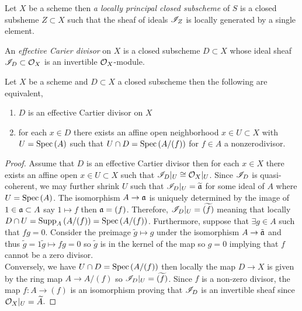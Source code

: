 \documentclass[12pt]{article}
\begin{document}
\begin{definition}
Let $X$ be a scheme then \textit{a locally principal closed subscheme} of $S$ is a closed subsheme $Z \subset X$ such that the sheaf of ideals $\mathscr{I}_Z$ is locally generated by a single element. 
\end{definition}

\begin{definition}
An \textit{effective Carier divisor} on $X$ is a closed subscheme $D \subset X$ whose ideal sheaf $\mathscr{I}_D \subset \mathcal{O}_{X}$ is an invertible $\mathcal{O}_{X}$-module. 
\end{definition}

\begin{definition}
Let $X$ be a scheme and $D \subset X$ a closed subscheme then the following are equivalent,
\begin{enumerate}
\item $D$ is an effective Cartier divisor on $X$
\item for each $x \in D$ there exists an affine open neighborhood $x \in U \subset X$ with $U = \mathrm{Spec}\left( A \right)$ such that $U \cap D = \mathrm{Spec}\left( A / (f) \right)$ for $f \in A$ a nonzerodivisor. 
\end{enumerate}
\end{definition}

\begin{proof}
Assume that $D$ is an effective Cartier divisor then for each $x \in X$ there exists an affine open $x \in U \subset X$ such that $\mathscr{I}_D |_U \cong \mathcal{O}_{X} |_U$. Since $\mathscr{I}_D$ is quasi-coherent, we may further shrink $U$ such that $\mathscr{I}_D |_U = \widetilde{\mathfrak{a}}$ for some ideal of $A$ where $U = \mathrm{Spec}\left( A \right)$. The isomorphism $A \to \mathfrak{a}$ is uniquely determined by the image of $1 \in \mathfrak{a} \subset A$ say $1 \mapsto f$ then $\mathfrak{a} = (f)$. Therefore, $\mathscr{I}_D |_U = \widetilde{(f)}$ meaning that locally $D \cap U = \mathrm{Supp}_{A}\left(A / (f) \right) = \mathrm{Spec}\left( A / (f) \right)$. Furthermore, suppose that $\exists g \in A$ such that $fg = 0$. Consider the preimage $\tilde{g} \mapsto g$ under the isomorphism $A \to \tilde{\mathfrak{a}}$ and thus $\tilde{g} = 1 \tilde{g} \mapsto fg = 0$ so $\tilde{g}$ is in the kernel of the map so $g = 0$ implying that $f$ cannot be a zero divisor.
\bigskip\\
Conversely, we have $U \cap D = \mathrm{Spec}\left( A / (f) \right)$ then locally the map $D \to X$ is given by the ring map $A \to A / (f)$ so $\mathscr{I}_D |_U = \widetilde{(f)}$. Since $f$ is a non-zero divisor, the map $f : A \to (f)$ is an isomorphism proving that $\mathscr{I}_D$ is an invertible sheaf since $\mathcal{O}_{X}|_U = \widetilde{A}$. 
\end{proof}
\end{document}
